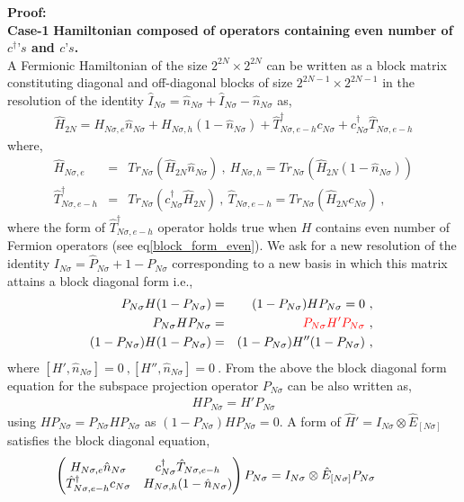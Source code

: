 \documentclass[12pt,a4paper]{article}
\begin{document}
\textbf{Proof:}\\
\textbf{Case-1} \textbf{Hamiltonian composed of operators containing even number of $c^{\dagger}\text{'}s$ and $c\text{'}s$.}\\
A Fermionic Hamiltonian  of the size $2^{2N}\times 2^{2N}$ can be written as a block matrix constituting diagonal and off-diagonal blocks of size $2^{2N-1}\times 2^{2N-1}$ in the resolution of the identity $\hat{I}_{N\sigma}=\hat{n}_{N\sigma}+\hat{I}_{N\sigma}-\hat{n}_{N\sigma}$ as,
\begin{eqnarray}
\hat{H}_{2N}=H_{N\sigma,e}\hat{n}_{N\sigma}+H_{N\sigma,h}(1-\hat{n}_{N\sigma})+\hat{T}^{\dagger}_{N\sigma,e-h}c_{N\sigma}+c^{\dagger}_{N\sigma}\hat{T}_{N\sigma,e-h}\nonumber
\end{eqnarray} 
where,
\begin{eqnarray}
\hat{H}_{N\sigma,e} &=& Tr_{N\sigma}(\hat{H}_{2N}\hat{n}_{N\sigma})~,~ H_{N\sigma,h} = Tr_{N\sigma}(\hat{H}_{2N}(1-\hat{n}_{N\sigma}))\nonumber\\
\hat{T}^{\dagger}_{N\sigma,e-h} &=& Tr_{N\sigma}(c^{\dagger}_{N\sigma}\hat{H}_{2N})~,~\hat{T}_{N\sigma,e-h} = Tr_{N\sigma}(\hat{H}_{2N}c_{N\sigma})~,\nonumber\label{block_matrix}
\end{eqnarray}
where the form of $\hat{T}^{\dagger}_{N\sigma,e-h}$ operator holds true when $H$ contains even number of Fermion operators (see eq\eqref{block_form_even}).
We ask for a new resolution of the identity $I_{N\sigma}=\hat{P}_{N\sigma}+1-P_{N\sigma}$ corresponding to a new basis in which this matrix attains a block diagonal form i.e.,
\begin{eqnarray}
P_{N\sigma}H(1-P_{N\sigma})&=&(1-P_{N\sigma})HP_{N\sigma}=0~,~\nonumber\\
P_{N\sigma}HP_{N\sigma} &=& \textcolor{red}{P_{N\sigma}H'P_{N\sigma}}~,~\nonumber\\
(1-P_{N\sigma})H(1-P_{N\sigma}) &=& (1-P_{N\sigma})H''(1-P_{N\sigma})~,~\nonumber
\end{eqnarray}
where $[H',\hat{n}_{N\sigma}]=0~,[H'',\hat{n}_{N\sigma}]=0~$. From the above the block diagonal form equation for the subspace projection operator $P_{N\sigma}$ can be also written as,
\begin{eqnarray}
HP_{N\sigma} = H'P_{N\sigma}
\end{eqnarray}
using $HP_{N\sigma} = P_{N\sigma}HP_{N\sigma}$ as $(1-P_{N\sigma})HP_{N\sigma}=0$.
 A form of $\hat{H}'=I_{N\sigma}\otimes\hat{E}_{[N\sigma]} $ satisfies the block diagonal equation,
\begin{eqnarray}
\hspace*{-1cm}
\begin{pmatrix}
			H_{N\sigma,e}\hat{n}_{N\sigma}								 & c^{\dagger}_{N\sigma}\hat{T}_{N\sigma,e-h}\\
				\hat{T}^{\dagger}_{N\sigma,e-h}c_{N\sigma}						& H_{N\sigma,h}(1-\hat{n}_{N\sigma})
											\end{pmatrix}P_{N\sigma}= I_{N\sigma}\otimes\hat{E}_{[N\sigma]}P_{N\sigma}\label{block_diagonal_eqn}
\end{eqnarray}
\end{document}
